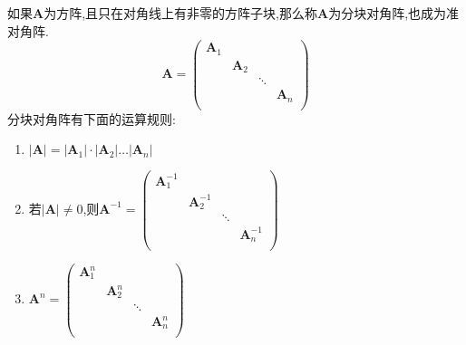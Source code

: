 如果$\mathbf{A}$为方阵,且只在对角线上有非零的方阵子块,那么称$\mathbf{A}$为分块对角阵,也成为准对角阵.
\begin{equation*}
    \mathbf{A}=\begin{pmatrix}
        \mathbf{A}_1   &      &      &      \\
           &   \mathbf{A}_2   &      &      \\
           &      &   \ddots   &      \\
           &      &      &   \mathbf{A}_n   \\
        \end{pmatrix}
\end{equation*}
分块对角阵有下面的运算规则:
\begin{enumerate}
    \item $\left\lvert \mathbf{A} \right\rvert =\left\lvert \mathbf{A} _1 \right\rvert \cdot \left\lvert \mathbf{A} _2 \right\rvert \dots \left\lvert \mathbf{A} _n \right\rvert $
    \item 若$\left\lvert \mathbf{A} \right\rvert\neq 0$,则$\mathbf{A}^{-1}=\begin{pmatrix}
        \mathbf{A}_1^{-1}   &      &      &      \\
           &   \mathbf{A}_2^{-1}   &      &      \\
           &      &   \ddots   &      \\
           &      &      &   \mathbf{A}_n^{-1}   \\
        \end{pmatrix}
    $
    \item $\mathbf{A}^{n}=\begin{pmatrix}
        \mathbf{A}_1^{n}   &      &      &      \\
           &   \mathbf{A}_2^{n}   &      &      \\
           &      &   \ddots   &      \\
           &      &      &   \mathbf{A}_n^{n}   \\
        \end{pmatrix}
    $
\end{enumerate}

